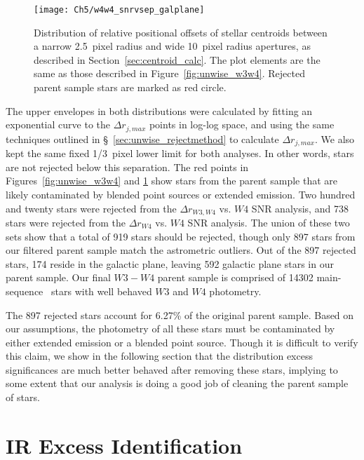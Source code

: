     \begin{figure}
    \centering
    \texttt{[image: Ch5/w4w4\_snrvsep\_galplane]}
    \caption[Rejected \textit{unWISE} stars using $W4$ to $W4$ offsets]{Distribution of relative positional offsets of stellar centroids between a narrow 2.5~pixel radius and wide 10~pixel radius apertures, as described in Section~\ref{sec:centroid_calc}. The plot elements are the same as those described in Figure~\ref{fig:unwise_w3w4}. Rejected parent sample stars are marked as red circle.}
    \label{fig:unwise_w4w4}
    \end{figure}
    
    The upper envelopes in both distributions were calculated by fitting an exponential curve to the $\Delta r_{j,max}$ points in log-log space, and using the same techniques outlined in \S~\ref{sec:unwise_rejectmethod} to calculate $\Delta r_{j,max}$. We also kept the same fixed 1/3~pixel lower limit for both analyses. In other words, stars are not rejected below this separation. The red points in Figures~\ref{fig:unwise_w3w4} and \ref{fig:unwise_w4w4} show stars from the parent sample that are likely contaminated by blended point sources or extended emission. Two hundred and twenty stars were rejected from the $\Delta r_{W3,W4}$ vs. $W4$ SNR analysis, and 738 stars were rejected from the $\Delta r_{W4}$ vs. $W4$ SNR analysis. The union of these two sets show that a total of 919 stars should be rejected, though only 897 stars from our filtered parent sample match the astrometric outliers. Out of the 897 rejected stars, 174 reside in the galactic plane, leaving 592 galactic plane stars in our parent sample. Our final $W3-W4$ parent sample is comprised of 14302 main-sequence \hip\ stars with well behaved $W3$ and $W4$ photometry. 
    
    The 897 rejected stars account for 6.27\% of the original parent sample. Based on our assumptions, the photometry of all these stars must be contaminated by either extended emission or a blended point source. Though it is difficult to verify this claim, we show in the following section that the distribution excess significances are much better behaved after removing these stars, implying to some extent that our analysis is doing a good job of cleaning the parent sample of stars. 
    

\section{IR Excess Identification}

